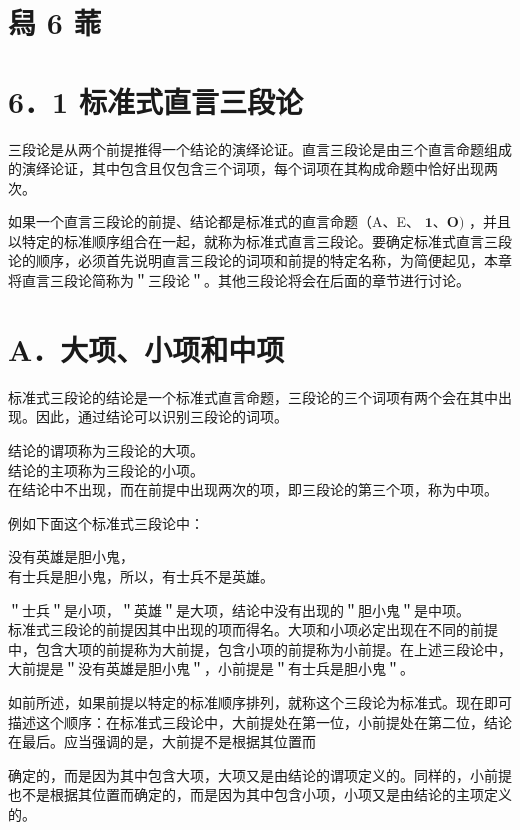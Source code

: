 \section*{舄 6 䓙}
\section*{6．1 标准式直言三段论}
三段论是从两个前提推得一个结论的演绎论证。直言三段论是由三个直言命题组成的演绎论证，其中包含且仅包含三个词项，每个词项在其构成命题中恰好出现两次。

如果一个直言三段论的前提、结论都是标准式的直言命题（A、E、 $\mathbf{1} 、 \mathbf{O})$ ，并且以特定的标准顺序组合在一起，就称为标准式直言三段论。要确定标准式直言三段论的顺序，必须首先说明直言三段论的词项和前提的特定名称，为简便起见，本章将直言三段论简称为＂三段论＂。其他三段论将会在后面的章节进行讨论。

\section*{A．大项、小项和中项}
标准式三段论的结论是一个标准式直言命题，三段论的三个词项有两个会在其中出现。因此，通过结论可以识别三段论的词项。

结论的谓项称为三段论的大项。\\
结论的主项称为三段论的小项。\\
在结论中不出现，而在前提中出现两次的项，即三段论的第三个项，称为中项。

例如下面这个标准式三段论中：

\begin{displayquote}
没有英雄是胆小鬼，\\
有士兵是胆小鬼，所以，有士兵不是英雄。
\end{displayquote}

＂士兵＂是小项，＂英雄＂是大项，结论中没有出现的＂胆小鬼＂是中项。\\
标准式三段论的前提因其中出现的项而得名。大项和小项必定出现在不同的前提中，包含大项的前提称为大前提，包含小项的前提称为小前提。在上述三段论中，大前提是＂没有英雄是胆小鬼＂，小前提是＂有士兵是胆小鬼＂。

如前所述，如果前提以特定的标准顺序排列，就称这个三段论为标准式。现在即可描述这个顺序：在标准式三段论中，大前提处在第一位，小前提处在第二位，结论在最后。应当强调的是，大前提不是根据其位置而

确定的，而是因为其中包含大项，大项又是由结论的谓项定义的。同样的，小前提也不是根据其位置而确定的，而是因为其中包含小项，小项又是由结论的主项定义的。

